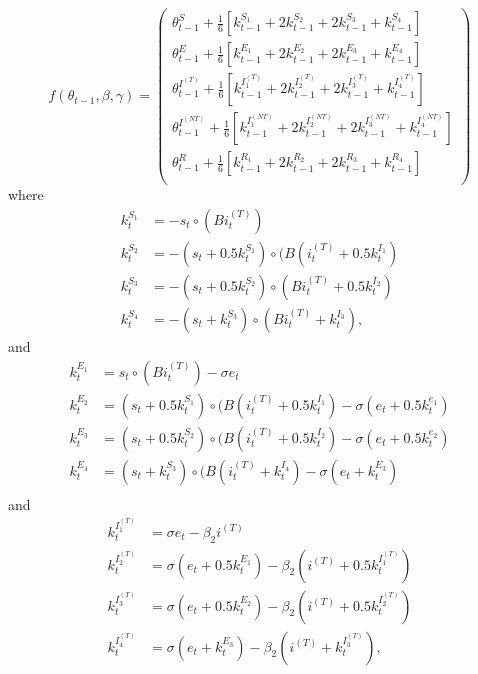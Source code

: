 \documentclass[12pt]{amsart}
\numberwithin{equation}{section}
\theoremstyle{plain}
\begin{document}
$$
f(\theta_{t-1}, \beta, \gamma) = \left(
\begin{array}{c}
\theta_{t-1}^{S} + \frac{1}{6} \left[ k_{t-1}^{S_1} + 2 k_{t-1}^{S_2} + 2 k_{t-1}^{S_3} + k_{t-1}^{S_4} \right] \\
\theta_{t-1}^{E} + \frac{1}{6} \left[ k_{t-1}^{E_1} + 2 k_{t-1}^{E_2} + 2 k_{t-1}^{E_3} + k_{t-1}^{E_4} \right] \\
\theta_{t-1}^{I^{(T)}} + \frac{1}{6} \left[ k_{t-1}^{I_1^{(T)}} + 2 k_{t-1}^{I_2^{(T)}} + 2 k_{t-1}^{I_3^{(T)}} + k_{t-1}^{I_4^{(T)}} \right] \\
\theta_{t-1}^{I^{(NT)}} + \frac{1}{6} \left[ k_{t-1}^{I_1^{(NT)}} + 2 k_{t-1}^{I_2^{(NT)}} + 2 k_{t-1}^{I_3^{(NT)}} + k_{t-1}^{I_4^{(NT)}} \right] \\
\theta_{t-1}^{R} + \frac{1}{6} \left[ k_{t-1}^{R_1} + 2 k_{t-1}^{R_2} + 2 k_{t-1}^{R_3} + k_{t-1}^{R_4} \right] \\
\end{array}
\right)
$$
where
\begin{align*}
k_t^{S_1} &= - s_t \circ (B i_t^{(T)}) \\
k_t^{S_2} &= - (s_t + 0.5 k_t^{S_1}) \circ (B (i_t^{(T)} + 0.5 k_t^{I_1}) \\
k_t^{S_3} &= - (s_t + 0.5 k_t^{S_2}) \circ (B i_t^{(T)} + 0.5 k_t^{I_2}) \\
k_t^{S_4} &= - (s_t + k_t^{S_3}) \circ (B i_t^{(T)} + k_t^{I_3}),
\end{align*}
and
\begin{align*}
k_t^{E_1} &= s_t \circ (B i_t^{(T)}) - \sigma e_t \\
k_t^{E_2} &= (s_t + 0.5 k_t^{S_1}) \circ (B (i_t^{(T)} + 0.5 k_t^{I_1}) - \sigma (e_t + 0.5 k_t^{e_1}) \\
k_t^{E_3} &= (s_t + 0.5 k_t^{S_2}) \circ (B (i_t^{(T)} + 0.5 k_t^{I_2}) - \sigma (e_t + 0.5 k_t^{e_2}) \\
k_t^{E_4} &= (s_t + k_t^{S_3}) \circ (B (i_t^{(T)} + k_t^{I_4}) - \sigma (e_t + k_t^{E_3}) \\
\end{align*}
and
\begin{align*}
k_t^{I_1^{(T)}} &= \sigma e_t - \beta_2 i^{(T)} \\
k_t^{I_2^{(T)}} &= \sigma (e_t + 0.5 k_t^{E_1}) - \beta_2 (i^{(T)} + 0.5 k_t^{I_1^{(T)}}) \\
k_t^{I_3^{(T)}} &= \sigma (e_t + 0.5 k_t^{E_2}) - \beta_2 (i^{(T)} + 0.5 k_t^{I_2^{(T)}}) \\
k_t^{I_4^{(T)}} &= \sigma (e_t + k_t^{E_3}) - \beta_2 (i^{(T)} + k_t^{I_3^{(T)}}),
\end{align*}
\end{document}
